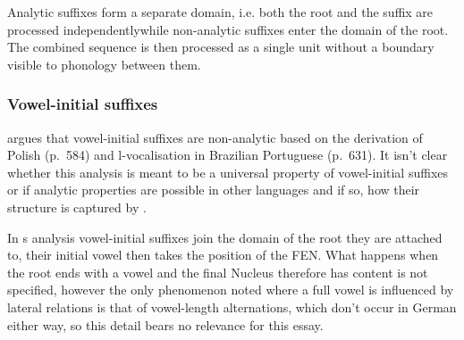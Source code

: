 Analytic suffixes form a separate domain, i.e. both the root and the
suffix are processed independently\co while non-analytic suffixes
enter the domain of the root. The combined sequence is then processed
as a single unit without a boundary visible to phonology between them.


\subsubsection{Vowel-initial suffixes}
\Textcite{scheer2004} argues that vowel-initial suffixes are non-analytic
based on the derivation of Polish  (p.~584) and
l-vocalisation in Brazilian Portuguese (p.~631).
It isn't clear whether this analysis is meant to be a universal
property of vowel-initial suffixes or if analytic properties are
possible in other languages and if so, how their structure is captured
by \CVCV\footnotemark.

In \citeauthor{scheer2004}s analysis vowel-initial suffixes join the domain
of the root they are attached to,
their initial vowel then takes the position of the \gls{FEN}.
What happens when the root ends with a vowel and the final Nucleus therefore has
content is not specified, however the only phenomenon noted where a full vowel is
influenced by lateral relations is that of vowel-length alternations, which don't
occur in German either way, so this detail bears no relevance for this essay.

